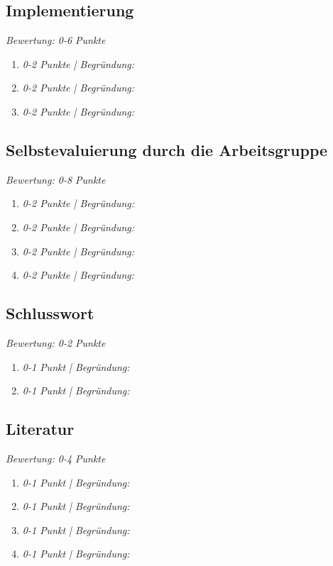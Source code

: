 \documentclass[deutsch, paper=a4]{scrartcl}
\begin{document}
\subsection{Implementierung}
\textit{Bewertung: 0-6 Punkte}\\
\begin{enumerate}[label=\alph*)]
\item \textit{0-2 Punkte | Begründung: }
\item \textit{0-2 Punkte | Begründung: }
\item \textit{0-2 Punkte | Begründung: }
\end{enumerate}

\subsection{Selbstevaluierung durch die Arbeitsgruppe}
\textit{Bewertung: 0-8 Punkte}\\
\begin{enumerate}[label=\alph*)]
\item \textit{0-2 Punkte | Begründung: }
\item \textit{0-2 Punkte | Begründung: }
\item \textit{0-2 Punkte | Begründung: }
\item \textit{0-2 Punkte | Begründung: }
\end{enumerate}

\subsection{Schlusswort}
\textit{Bewertung: 0-2 Punkte}\\
\begin{enumerate}[label=\alph*)]
\item \textit{0-1 Punkt | Begründung: }
\item \textit{0-1 Punkt | Begründung: }
\end{enumerate}

\subsection{Literatur}
\textit{Bewertung: 0-4 Punkte}\\
\begin{enumerate}[label=\alph*)]
\item \textit{0-1 Punkt | Begründung: }
\item \textit{0-1 Punkt | Begründung: }
\item \textit{0-1 Punkt | Begründung: }
\item \textit{0-1 Punkt | Begründung: }
\end{enumerate}
\end{document}
